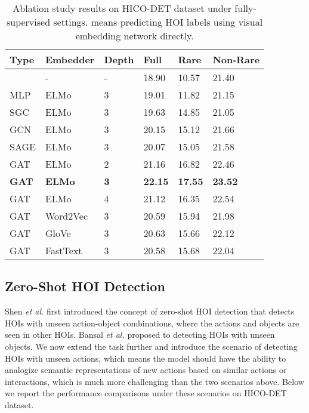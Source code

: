 \documentclass[sigconf,screen]{acmart}
\begin{document}
\begin{table}
\renewcommand\tabcolsep{4pt}
\caption{Ablation study results on HICO-DET dataset under fully-supervised settings.  means predicting HOI labels using visual embedding network directly.}
\label{tab:4}
\begin{tabularx}{\linewidth}{p{0.95cm}<{\centering}|p{1.55cm}<{\centering}|p{1cm}<{\centering}|p{1cm}<{\centering}p{1cm}<{\centering}p{1cm}<{\centering}p{1cm}<{\centering}}
\toprule
\textbf{Type}&\textbf{Embedder}&\textbf{Depth}&\textbf{Full}&\textbf{Rare}&\multicolumn{2}{l}{\hspace{-0.15cm}\textbf{Non-Rare}}\\
\midrule
&-&-&18.90&10.57&21.40\\
MLP&ELMo&3&19.01&11.82&21.15\\
SGC&ELMo&3&19.63&14.85&21.05\\
GCN&ELMo&3&20.15&15.12&21.66\\
SAGE&ELMo&3&20.07&15.05&21.58\\
\midrule
GAT&ELMo&2&21.16&16.82&22.46\\
\textbf{GAT}&\textbf{ELMo}&\textbf{3}&\textbf{22.15}&\textbf{17.55}&\textbf{23.52}\\
GAT&ELMo&4&21.12&16.35&22.54\\
\midrule
GAT&Word2Vec&3&20.59&15.94&21.98\\
GAT&GloVe&3&20.63&15.66&22.12\\
GAT&FastText&3&20.58&15.68&22.04\\
\bottomrule
\end{tabularx}
\end{table}

\subsection{Zero-Shot HOI Detection}

Shen \textit{et al.} \cite{shen2018scaling} first introduced the concept of zero-shot HOI detection that detects HOIs with unseen action-object combinations, where the actions and objects are seen in other HOIs. Bansal \textit{et al.} \cite{bansal2019detecting} proposed to detecting HOIs with unseen objects. We now extend the task further and introduce the scenario of detecting HOIs with unseen actions, which means the model should have the ability to analogize semantic representations of new actions based on similar actions or interactions, which is much more challenging than the two scenarios above. Below we report the performance comparisons under these scenarios on HICO-DET dataset.
\end{document}
